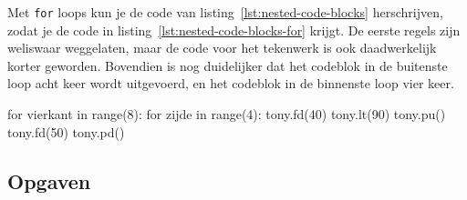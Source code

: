 \documentclass[../main]{subfiles}
\begin{document}
Met \texttt{for} loops kun je de code van listing~\ref{lst:nested-code-blocks} herschrijven, zodat je de code in listing~\ref{lst:nested-code-blocks-for} krijgt. De eerste regels zijn weliswaar weggelaten, maar de code voor het tekenwerk is ook daadwerkelijk korter geworden. Bovendien is nog duidelijker dat het codeblok in de buitenste loop acht keer wordt uitgevoerd, en het codeblok in de binnenste loop vier keer.

\begin{python}[style=mu, caption={De while loops uit listing~\ref{lst:nested-code-blocks} vervangen door for loops}, label={lst:nested-code-blocks-for}, firstnumber=5]
for vierkant in range(8):
    for zijde in range(4):
        tony.fd(40)
        tony.lt(90)
    tony.pu()
    tony.fd(50)
    tony.pd()
\end{python}
\clearpage
\subsection*{Opgaven}
\end{document}
